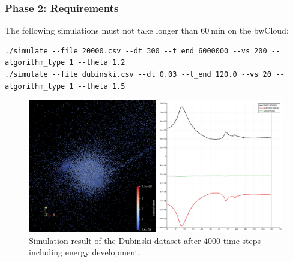 \begin{frame}[fragile]
    \frametitle{Phase 2: Requirements}
    
    The following simulations must not take longer than $\SI{60}{\minute}$ on the bwCloud:
    \vspace*{-.5em}
    \begin{center}
    \setfontsize{7pt}
    \begin{verbatim}
./simulate --file 20000.csv --dt 300 --t_end 6000000 --vs 200 --algorithm_type 1 --theta 1.2
./simulate --file dubinski.csv --dt 0.03 --t_end 120.0 --vs 20 --algorithm_type 1 --theta 1.5
    \end{verbatim}
    \vspace*{-1.5em}
    \begin{figure}
        \captionsetup{justification=centering}
        \includegraphics[width=.65\textwidth]{figures/result_phase_2.png}
        \caption{Simulation result of the Dubinski dataset after $\num{4000}$ time steps including energy development.}
    \end{figure}
    \end{center}
\end{frame}


